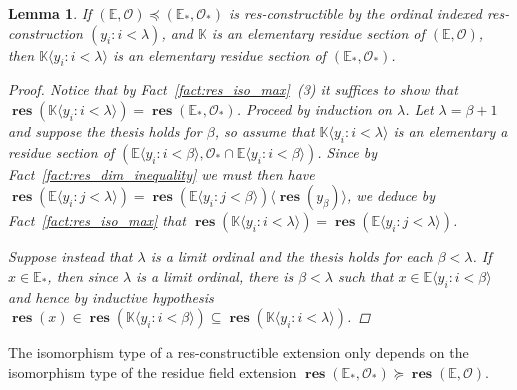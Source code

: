 \documentclass{amsart}
\newtheorem{lemma}[theorem]{Lemma}
\theoremstyle{remark}
\theoremstyle{definition}
\theoremstyle{plain}
\newcommand{\bE}{\mathbb E}
\newcommand{\bK}{\mathbb K}
\newcommand{\cO}{\mathcal O}
\DeclareMathOperator{\res}{\mathbf{res}}
\theoremstyle{plain}
\begin{document}
\begin{lemma}\label{lem:res-constructible_residue_sections}
    If $(\bE, \cO)\preceq (\bE_*, \cO_*)$ is res-constructible by the ordinal indexed res-construction $(y_i: i < \lambda)$, and $\bK$ is an elementary residue section of $(\bE, \cO)$, then $\bK \langle y_i: i< \lambda\rangle$ is an elementary residue section of $(\bE_*, \cO_*)$.
    \begin{proof}
        Notice that by Fact~\ref{fact:res_iso_max}~(3) it suffices to show that $\res(\bK \langle y_i : i <\lambda \rangle)=\res(\bE_*, \cO_*)$.
        Proceed by induction on $\lambda$. Let $\lambda= \beta+1$ and suppose the thesis holds for $\beta$, so assume that $\bK \langle y_i: i< \lambda\rangle$ is an elementary a residue section of $(\bE\langle y_i: i<\beta\rangle, \cO_* \cap \bE\langle y_i: i<\beta\rangle)$. Since by Fact~\ref{fact:res_dim_inequality} we must then have $\res(\bE \langle y_i: j < \lambda\rangle) = \res(\bE \langle y_i: j < \beta\rangle) \langle \res(y_\beta)\rangle$, we deduce by Fact~\ref{fact:res_iso_max} that $\res(\bK \langle y_i : i <\lambda \rangle)=\res(\bE \langle y_i: j < \lambda\rangle)$.

        Suppose instead that $\lambda$ is a limit ordinal and the thesis holds for each $\beta<\lambda$. If $x \in \bE_*$, then since $\lambda$ is a limit ordinal, there is $\beta<\lambda$ such that $x \in \bE \langle y_i : i< \beta \rangle$ and hence by inductive hypothesis $\res(x) \in \res(\bK \langle y_i : i <\beta \rangle) \subseteq \res(\bK \langle y_i:i < \lambda \rangle)$.
    \end{proof}
\end{lemma}

The isomorphism type of a res-constructible extension only depends on the isomorphism type of the residue field extension $\res(\bE_*, \cO_*) \succeq \res(\bE, \cO)$.
\end{document}
